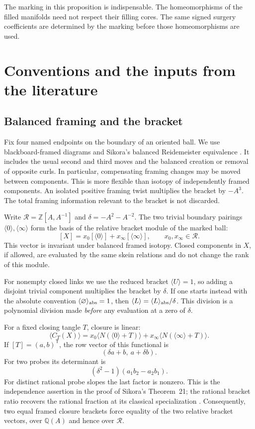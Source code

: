 \documentclass[11pt]{amsart}
\theoremstyle{definition}
\theoremstyle{remark}
\newcommand{\Z}{\mathbb Z}
\newcommand{\Q}{\mathbb Q}
\newcommand{\br}[1]{\langle #1\rangle}
\newcommand{\cl}[2]{C_{#1}(#2)}
\newcommand{\tang}[1]{\langle #1\rangle}
\begin{document}
The marking in this proposition is indispensable. The
homeomorphisms of the filled manifolds need not respect their
filling cores. The same signed surgery coefficients are determined
by the marking before those homeomorphisms are used.

\section{Conventions and the inputs from the literature}\label{sec:prelim}

\subsection{Balanced framing and the bracket}

Fix four named endpoints on the boundary of an oriented ball.
We use blackboard-framed diagrams and Sikora's balanced
Reidemeister equivalence \cite[Section~4 and Figure~5]{Sikora}.
It includes the usual second and third moves and the balanced
creation or removal of opposite curls. In particular, compensating
framing changes may be moved between components. This is more
flexible than isotopy of independently framed components.
An isolated positive framing twist multiplies the bracket by
\(-A^3\). The total framing information relevant to the bracket
is not discarded.

Write \(\mathcal R=\Z[A,A^{-1}]\) and
\(\delta=-A^2-A^{-2}\). The two trivial boundary pairings
\(\tang0,\tang\infty\) form the basis of the relative bracket
module of the marked ball:
\[
 [X]=x_0[\tang0]+x_\infty[\tang\infty],
 \qquad x_0,x_\infty\in\mathcal R.
\]
This vector is invariant under balanced framed isotopy.
Closed components in \(X\), if allowed, are evaluated by the same
skein relations and do not change the rank of this module.

For nonempty closed links we use the reduced bracket
\(\br U=1\), so adding a disjoint trivial component multiplies
the bracket by \(\delta\). If one starts instead with the
absolute convention \(\br{\varnothing}_{\rm abs}=1\),
then \(\br L=\br L_{\rm abs}/\delta\).
This division is a polynomial division made \emph{before}
any evaluation at a zero of \(\delta\).

For a fixed closing tangle \(T\), closure is linear:
\begin{equation}\label{eq:closurefunctional}
 \br{\cl T X}
 =x_0\br{N(\tang0+T)}+
  x_\infty\br{N(\tang\infty+T)}.
\end{equation}
If \([T]=(a,b)^{\mathsf T}\), the row vector of this
functional is
\[
 (\delta a+b,\ a+\delta b).
\]
For two probes its determinant is
\begin{equation}\label{eq:closurematrix}
 (\delta^2-1)(a_1b_2-a_2b_1).
\end{equation}
For distinct rational probe slopes the last factor is nonzero.
This is the independence assertion in the proof of Sikora's
Theorem~21; the rational bracket ratio recovers the rational
fraction at its classical specialization
\cite[Corollary~19 and Theorem~21]{Sikora}.
Consequently, two equal framed closure brackets force equality
of the two relative bracket vectors, over \(\Q(A)\) and hence
over \(\mathcal R\).
\end{document}
